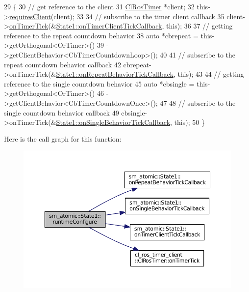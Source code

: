 \begin{DoxyCode}
29     \{
30         \textcolor{comment}{// get reference to the client}
31         \hyperlink{classcl__ros__timer__client_1_1ClRosTimer}{ClRosTimer} *client;
32         this->\hyperlink{classsmacc_1_1ISmaccState_a7f95c9f0a6ea2d6f18d1aec0519de4ac}{requiresClient}(client);
33 
34         \textcolor{comment}{// subscribe to the timer client callback}
35         client->\hyperlink{classcl__ros__timer__client_1_1ClRosTimer_ac2d4e684325731df4dc4fc5b7b8a9dbd}{onTimerTick}(&\hyperlink{structsm__atomic_1_1State1_adea28f0a0fcedb210a29656f53aeee09}{State1::onTimerClientTickCallback},
       \textcolor{keyword}{this});
36 
37         \textcolor{comment}{// getting reference to the repeat countdown behavior}
38         \textcolor{keyword}{auto} *cbrepeat = this->getOrthogonal<OrTimer>()
39                              ->getClientBehavior<CbTimerCountdownLoop>();
40 
41         \textcolor{comment}{// subscribe to the repeat countdown behavior callback}
42         cbrepeat->onTimerTick(&\hyperlink{structsm__atomic_1_1State1_a9d2c943f02a8e0f1d7b86132ada1c6e0}{State1::onRepeatBehaviorTickCallback}, \textcolor{keyword}{
      this});
43 
44         \textcolor{comment}{// getting reference to the single countdown behavior}
45         \textcolor{keyword}{auto} *cbsingle = this->getOrthogonal<OrTimer>()
46                              ->getClientBehavior<CbTimerCountdownOnce>();
47 
48         \textcolor{comment}{// subscribe to the single countdown behavior callback}
49         cbsingle->onTimerTick(&\hyperlink{structsm__atomic_1_1State1_a9cb95d91cf5a22f0d9d079dc04bf58aa}{State1::onSingleBehaviorTickCallback}, \textcolor{keyword}{
      this});
50     \}
\end{DoxyCode}


Here is the call graph for this function\+:
\nopagebreak
\begin{figure}[H]
\begin{center}
\leavevmode
\includegraphics[width=350pt]{structsm__atomic_1_1State1_a47c2e651bb707f14d9b32f92c44f8ebc_cgraph}
\end{center}
\end{figure}


